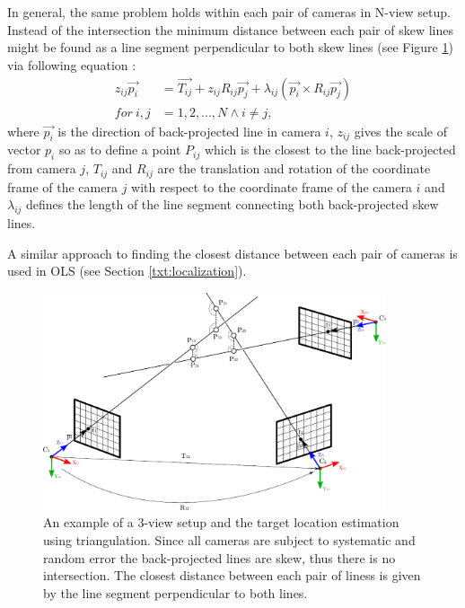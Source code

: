 In general, the same problem holds within each pair of cameras in N-view setup. Instead of the intersection the minimum distance between each pair of skew lines might be found as a line segment perpendicular to both skew lines (see Figure \ref{fig:multi_view_intersection}) via following equation \cite{Forsyth:2002:CVM:580035}:
\begin{align}
	z_{ij}\vec{p_{i}} &= \vec{T_{ij}} + z_{ij}R_{ij}\vec{p_{j}} + \lambda_{ij}(\vec{p_{i}} \times R_{ij}\vec{p_{j}})\\
	for~i,j           &= 1,2,...,N \land i \neq j,
\end{align}
where $\vec{p_{i}}$ is the direction of back-projected line in camera $i$, $z_{ij}$ gives the scale of vector ${p_{i}}$ so as to define a point $P_{ij}$ which is the closest to the line back-projected from camera $j$, $T_{ij}$ and $R_{ij}$ are the translation and rotation of the coordinate frame of the camera $j$ with respect to the coordinate frame of the camera $i$ and $\lambda_{ij}$ defines the length of the line segment connecting both back-projected skew lines.

A similar approach to finding the closest distance between each pair of cameras is used in OLS (see Section \ref{txt:localization}).

\begin{figure}[tbh]
	\centering
	\includegraphics[width=0.9\textwidth]{fig/multi_view_intersection.pdf}
	\caption{An example of a 3-view setup and the target location estimation using triangulation. Since all cameras are subject to systematic and random error the back-projected lines are skew, thus there is no intersection. The closest distance between each pair of liness is given by the line segment perpendicular to both lines.}
	\label{fig:multi_view_intersection}
\end{figure}

